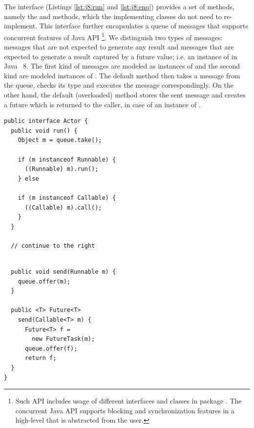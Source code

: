 The  interface (Listings \ref{lst:j8:run} and \ref{lst:j8:enq})
provides a set of  methods, namely the  and  methods,  which the implementing classes do not need to re-implement.
This interface further  encapsulates a queue of messages that supports concurrent features of Java API
\footnote{Such API includes usage of different interfaces and classes in  package \cite{jsr166}.
The concurrent Java API supports blocking and synchronization features in a high-level that is abstracted from the user.}.
We distinguish two types of messages:
messages that are  not expected to generate  any result and messages that are  expected to generate a result captured by a future value; i.e. 
an instance of  in Java~ 8.
The first kind of messages are modeled as instances of  and the second kind are modeled instances of .
The default  method then takes a message from the queue, checks its type and executes the message correspondingly.
On the other hand, the default (overloaded)  method stores the sent message and creates a future
which is returned to the caller, in case of an instance of .

\begin{center}
\begin{minipage}[t]{0.48\textwidth}
\begin{lstlisting}[caption=Actor interface (1) ,label=lst:j8:run]
public interface Actor {
  public void run() {
    Object m = queue.take();

    if (m instanceof Runnable) {
      ((Runnable) m).run();
    } else 

    if (m instanceof Callable) {
      ((Callable) m).call();
    } 
  }

  // continue to the right
\end{lstlisting}
\end{minipage}
\hfill
\begin{minipage}[t]{0.48\textwidth}
\begin{lstlisting}[caption=Actor interface (2),label=lst:j8:enq]

  public void send(Runnable m) {
    queue.offer(m);
  }

  public <T> Future<T> 
    send(Callable<T> m) {
      Future<T> f = 
        new FutureTask(m);
      queue.offer(f);
      return f;
  }
}
\end{lstlisting}
\end{minipage}
\end{center}

